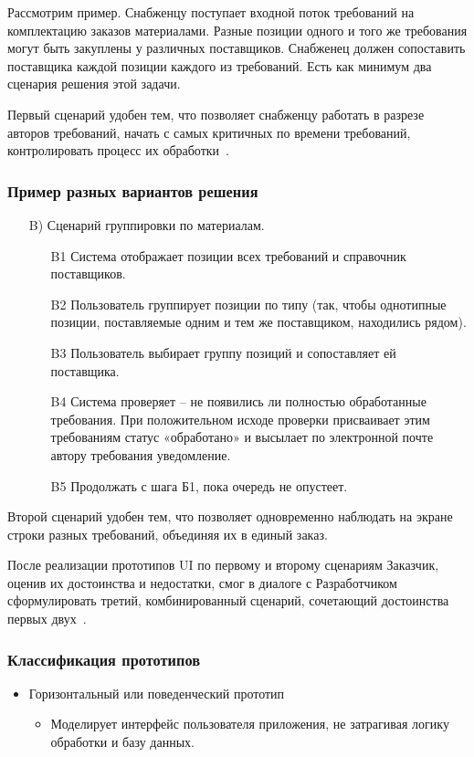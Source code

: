 \documentclass{../industrial-development}
\begin{document}
{\lecturenotes

Рассмотрим пример. Снабженцу поступает входной поток требований на комплектацию заказов материалами. Разные позиции одного и того же требования могут быть закуплены у различных поставщиков. Снабженец должен сопоставить поставщика
каждой позиции каждого из требований. Есть как минимум два сценария решения этой задачи.

Первый сценарий удобен тем, что позволяет снабженцу работать в разрезе авторов
требований, начать с самых критичных по времени требований, контролировать процесс
их обработки~\cite[с.~53]{Maglinec}.


\begin{frame} \frametitle {Пример разных вариантов решения}
\begin{itemize}
\item[B)] Сценарий группировки по материалам.
\begin{itemize}
\item[B1] Система отображает позиции всех требований и справочник поставщиков.
\item[B2] Пользователь группирует позиции по типу (так, чтобы однотипные позиции,
поставляемые одним и тем же поставщиком, находились рядом).
\item[B3] Пользователь выбирает группу позиций и сопоставляет ей поставщика.
\item[B4] Система проверяет – не появились ли полностью обработанные требования.
При положительном исходе проверки присваивает этим требованиям статус «обработано»
и высылает по электронной почте автору требования уведомление.
\item[B5] Продолжать с шага Б1, пока очередь не опустеет.
\end{itemize}
\end{itemize}
\end{frame}

\lecturenotes

Второй сценарий удобен тем, что позволяет одновременно наблюдать на
экране строки разных требований, объединяя их в единый заказ.

После реализации прототипов UI по первому и второму сценариям Заказчик,
оценив их достоинства и недостатки, смог в диалоге с Разработчиком сформулировать
третий, комбинированный сценарий, сочетающий достоинства первых двух~\cite[с.~53]{Maglinec}.


\begin{frame} \frametitle {Классификация прототипов}
\begin{itemize}
\item \alert{Горизонтальный или поведенческий прототип} 
\begin{itemize}
 \item Моделирует интерфейс пользователя приложения, не затрагивая логику
обработки и базу данных.
\end{itemize}


\end{itemize}
\end{frame}}
\end{document}
